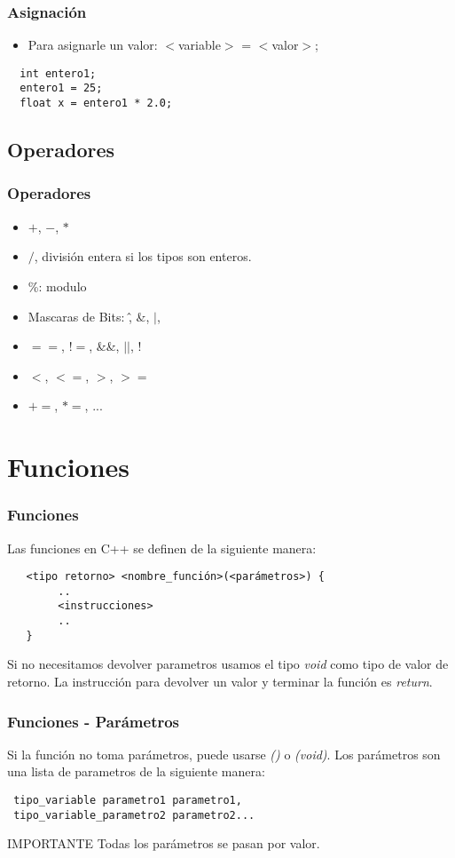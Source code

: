 \documentclass{beamer}
\begin{document}
\begin{frame}[fragile]
\frametitle{Asignación}
\begin{itemize}
 \item Para asignarle un valor: $<$variable$>$ = $<$valor$>$;
\end{itemize}
\begin{verbatim}
  int entero1;
  entero1 = 25;
  float x = entero1 * 2.0;
\end{verbatim}

\end{frame}

\subsection{Operadores}

\begin{frame}
\frametitle{Operadores}
\begin{itemize}
 \item $+$, $-$, $*$
 \item $/$, división entera si los tipos son enteros.
 \item \%: modulo 
 \item Mascaras de Bits: \^, \&, $|$, $~$
 \item $==$, $!=$, \&\&, $||$, $!$
 \item $<$, $<=$, $>$, $>=$
 \item $+=$, $*=$, ...
\end{itemize}

\end{frame}

\section{Funciones}
\begin{frame}[fragile]
\frametitle{Funciones}
Las funciones en C++ se definen de la siguiente manera:
\begin{verbatim}
   <tipo retorno> <nombre_función>(<parámetros>) {
        ..
        <instrucciones>
        ..
   }
\end{verbatim}
Si no necesitamos devolver parametros usamos el tipo \emph{void} como tipo de valor de retorno.
La instrucción para devolver un valor y terminar la función es \emph{return}.
\end{frame}

\begin{frame}[fragile]
\frametitle{Funciones - Parámetros}
Si la función no toma parámetros, puede usarse \emph{()} o \emph{(void)}.
Los parámetros son una lista de parametros de la siguiente manera:
\begin{verbatim}
 tipo_variable parametro1 parametro1, 
 tipo_variable_parametro2 parametro2...
\end{verbatim}
\begin{block}{IMPORTANTE}
 Todas los parámetros se pasan por valor.
\end{block}
\end{frame}
\end{document}
